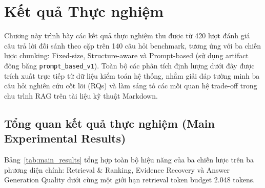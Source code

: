 
\section{Kết quả Thực nghiệm}
\label{sec:results}

Chương này trình bày các kết quả thực nghiệm thu được từ 420 lượt đánh giá câu trả lời đối sánh theo cặp trên 140 câu hỏi benchmark, tương ứng với ba chiến lược chunking: Fixed-size, Structure-aware và Prompt-based (sử dụng artifact đông băng \texttt{prompt\_based\_v1}). Toàn bộ các phân tích định lượng dưới đây được trích xuất trực tiếp từ dữ liệu kiểm toán hệ thống, nhằm giải đáp tường minh ba câu hỏi nghiên cứu cốt lõi (RQs) và làm sáng tỏ các mối quan hệ trade-off trong chu trình RAG trên tài liệu kỹ thuật Markdown.

\subsection{Tổng quan kết quả thực nghiệm (Main Experimental Results)}
\label{subsec:main_results}

Bảng~\ref{tab:main_results} tổng hợp toàn bộ hiệu năng của ba chiến lược trên ba phương diện chính: Retrieval \& Ranking, Evidence Recovery và Answer Generation Quality dưới cùng một giới hạn retrieval token budget 2.048 tokens.

